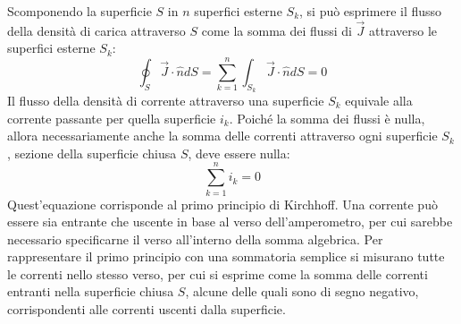 \documentclass{article}
\numberwithin{equation}{subsection}
\begin{document}
Scomponendo la superficie $S$ in $n$ superfici esterne $S_k$, si può esprimere il flusso della densità di carica attraverso $S$ come la somma dei flussi di $\vec{J}$ attraverso 
le superfici esterne $S_k$:
\begin{equation*}
    \displaystyle\oint_{S}\vec{J}\cdot\hat{n}dS=\sum_{k=1}^n\int_{S_k}\vec{J}\cdot\hat{n}dS=0
\end{equation*}
Il flusso della densità di corrente attraverso una superficie $S_k$ equivale alla corrente passante per quella superficie $i_k$. Poiché la somma dei flussi è nulla, allora 
necessariamente anche la somma delle correnti attraverso ogni superficie $S_k$, sezione della superficie chiusa $S$, deve essere nulla:
\begin{equation}
    \displaystyle\sum_{k=1}^ni_k=0
\end{equation}
Quest'equazione corrisponde al primo principio di Kirchhoff. Una corrente può essere sia entrante che uscente in base al verso dell'amperometro, per cui sarebbe necessario 
specificarne il verso all'interno della somma algebrica. Per rappresentare il primo principio con una sommatoria semplice si misurano tutte le correnti nello stesso verso, 
per cui si esprime come la somma delle correnti entranti nella superficie chiusa $S$, alcune delle quali sono di segno negativo, corrispondenti alle correnti uscenti dalla 
superficie. 

\begin{center}
\end{center}
\end{document}

